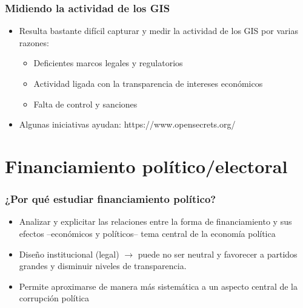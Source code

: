 \documentclass[handout,final,xcolor=dvipsnames]{beamer}
\begin{document}
\begin{frame}\frametitle{Midiendo la actividad de los GIS}
\begin{itemize}\itemsep 15pt
\item Resulta bastante difícil capturar y medir la actividad de los
  GIS por varias razones:
\begin{itemize}\itemsep 15pt \medskip
\item Deficientes marcos legales y regulatorios
\item Actividad ligada con la transparencia de intereses económicos
\item Falta de control y sanciones
\end{itemize}
\item Algunas iniciativas ayudan: https://www.opensecrets.org/
\end{itemize}
\end{frame}


\section{Financiamiento político/electoral}

\begin{frame}\frametitle{¿Por qué estudiar financiamiento político?}
\begin{itemize}\itemsep 15pt
\item Analizar y explicitar las relaciones entre la forma de
  financiamiento y sus efectos --económicos y políticos-- tema central
  de la economía política
\item Diseño institucional (legal) $\longrightarrow$ puede no ser neutral y
  favorecer a partidos grandes y disminuir niveles de transparencia.
\item Permite aproximarse de manera más sistemática a un aspecto
  central de la corrupción política
\end{itemize}
\end{frame}
\end{document}
